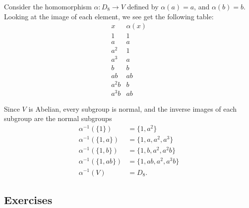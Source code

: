 \begin{example}
  Consider the homomorphism $\alpha: D_{8} \to V$ defined by 
  $\alpha(a) = a$, and $\alpha(b) = b$.  Looking at the image of each 
  element, we see get the following table:
  \[
    \begin{array}{c|c}
      x & \alpha(x) \\
      \hline
      1 & 1 \\
      a & a \\
      a^{2} & 1 \\
      a^{3} & a \\
      b & b \\
      ab & ab \\
      a^{2}b & b \\
      a^{3}b & ab
    \end{array}
  \]
  
  Since $V$ is Abelian, every subgroup is normal, and the inverse 
  images of each subgroup are the normal subgroups
  \begin{align*}
     \alpha^{-1}(\{1\}) &= \{1, a^{2}\} \\
     \alpha^{-1}(\{1, a\}) &= \{1, a, a^{2}, a^{3}\} \\
     \alpha^{-1}(\{1, b\}) &= \{1, b, a^{2}, a^{2}b\} \\
     \alpha^{-1}(\{1, ab\}) &= \{1, ab, a^{2}, a^{3}b\} \\
     \alpha^{-1}(V) &= D_{8}.
  \end{align*}
\end{example}


\subsection*{Exercises}

